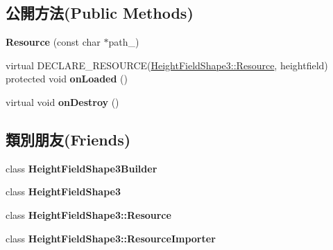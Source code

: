 \subsection*{公開方法(Public Methods)}
\begin{DoxyCompactItemize}
\item 
{\bfseries Resource} (const char $\ast$path\+\_\+)\hypertarget{class_magnum_1_1_height_field_shape3_1_1_resource_a8992a3e14c3523a358a860b557eacc2c}{}\label{class_magnum_1_1_height_field_shape3_1_1_resource_a8992a3e14c3523a358a860b557eacc2c}

\item 
virtual D\+E\+C\+L\+A\+R\+E\+\_\+\+R\+E\+S\+O\+U\+R\+CE(\hyperlink{class_magnum_1_1_height_field_shape3_1_1_resource}{Height\+Field\+Shape3\+::\+Resource}, heightfield) protected void {\bfseries on\+Loaded} ()\hypertarget{class_magnum_1_1_height_field_shape3_1_1_resource_a9132bc027b0df630bdc8a50ce0d7958f}{}\label{class_magnum_1_1_height_field_shape3_1_1_resource_a9132bc027b0df630bdc8a50ce0d7958f}

\item 
virtual void {\bfseries on\+Destroy} ()\hypertarget{class_magnum_1_1_height_field_shape3_1_1_resource_a2317128aade9753238e475381d410df5}{}\label{class_magnum_1_1_height_field_shape3_1_1_resource_a2317128aade9753238e475381d410df5}

\end{DoxyCompactItemize}
\subsection*{類別朋友(Friends)}
\begin{DoxyCompactItemize}
\item 
class {\bfseries Height\+Field\+Shape3\+Builder}\hypertarget{class_magnum_1_1_height_field_shape3_1_1_resource_ad601eb47f5c3430dca8c88f9dd93b2da}{}\label{class_magnum_1_1_height_field_shape3_1_1_resource_ad601eb47f5c3430dca8c88f9dd93b2da}

\item 
class {\bfseries Height\+Field\+Shape3}\hypertarget{class_magnum_1_1_height_field_shape3_1_1_resource_ab808f8979681967b9d908bfe30f4841b}{}\label{class_magnum_1_1_height_field_shape3_1_1_resource_ab808f8979681967b9d908bfe30f4841b}

\item 
class {\bfseries Height\+Field\+Shape3\+::\+Resource}\hypertarget{class_magnum_1_1_height_field_shape3_1_1_resource_a489733af8b1e9cab1ee9700c1f619014}{}\label{class_magnum_1_1_height_field_shape3_1_1_resource_a489733af8b1e9cab1ee9700c1f619014}

\item 
class {\bfseries Height\+Field\+Shape3\+::\+Resource\+Importer}\hypertarget{class_magnum_1_1_height_field_shape3_1_1_resource_a42ac71e9d35461ef687afa596057b1a9}{}\label{class_magnum_1_1_height_field_shape3_1_1_resource_a42ac71e9d35461ef687afa596057b1a9}

\end{DoxyCompactItemize}
